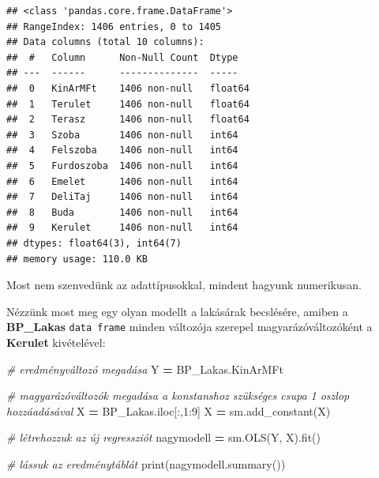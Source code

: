 \documentclass[
]{book}
\newenvironment{Shaded}{\begin{snugshade}}{\end{snugshade}}
\newcommand{\BuiltInTok}[1]{#1}
\newcommand{\CommentTok}[1]{\textcolor[rgb]{0.56,0.35,0.01}{\textit{#1}}}
\newcommand{\DecValTok}[1]{\textcolor[rgb]{0.00,0.00,0.81}{#1}}
\newcommand{\NormalTok}[1]{#1}
\newcommand{\OperatorTok}[1]{\textcolor[rgb]{0.81,0.36,0.00}{\textbf{#1}}}
\begin{document}
\begin{verbatim}
## <class 'pandas.core.frame.DataFrame'>
## RangeIndex: 1406 entries, 0 to 1405
## Data columns (total 10 columns):
##  #   Column      Non-Null Count  Dtype  
## ---  ------      --------------  -----  
##  0   KinArMFt    1406 non-null   float64
##  1   Terulet     1406 non-null   float64
##  2   Terasz      1406 non-null   float64
##  3   Szoba       1406 non-null   int64  
##  4   Felszoba    1406 non-null   int64  
##  5   Furdoszoba  1406 non-null   int64  
##  6   Emelet      1406 non-null   int64  
##  7   DeliTaj     1406 non-null   int64  
##  8   Buda        1406 non-null   int64  
##  9   Kerulet     1406 non-null   int64  
## dtypes: float64(3), int64(7)
## memory usage: 110.0 KB
\end{verbatim}

Most nem szenvedünk az adattípusokkal, mindent hagyunk numerikusan.

Nézzünk most meg egy olyan modellt a lakásárak becslésére, amiben a \textbf{BP\_Lakas} \texttt{data\ frame} minden változója szerepel magyarázóváltozóként a \textbf{Kerulet} kivételével:

\begin{Shaded}
\begin{Highlighting}[]
\CommentTok{\# eredményváltozó megadása}
\NormalTok{Y }\OperatorTok{=}\NormalTok{ BP\_Lakas.KinArMFt}

\CommentTok{\# magyarázóváltozók megadása a konstanshoz szükséges csupa 1 oszlop hozzáadásával}
\NormalTok{X }\OperatorTok{=}\NormalTok{ BP\_Lakas.iloc[:,}\DecValTok{1}\NormalTok{:}\DecValTok{9}\NormalTok{]}
\NormalTok{X }\OperatorTok{=}\NormalTok{ sm.add\_constant(X)}

\CommentTok{\# létrehozzuk az új regressziót}
\NormalTok{nagymodell }\OperatorTok{=}\NormalTok{ sm.OLS(Y, X).fit()}

\CommentTok{\# lássuk az eredménytáblát}
\BuiltInTok{print}\NormalTok{(nagymodell.summary())}
\end{Highlighting}
\end{Shaded}
\end{document}

